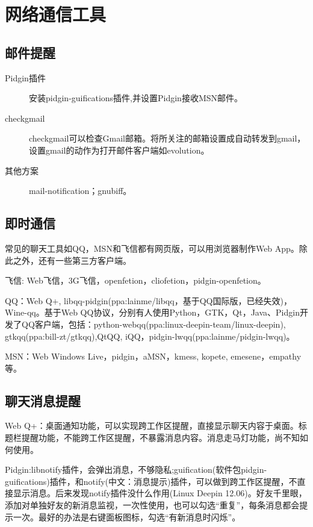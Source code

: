 \section{网络通信工具}

\subsection{邮件提醒}

\begin{description}
    \item[Pidgin插件]安装pidgin-guifications插件,并设置Pidgin接收MSN邮件。
    \item[checkgmail]checkgmail可以检查Gmail邮箱。将所关注的邮箱设置成自动转发到gmail，设置gmail的动作为打开邮件客户端如evolution。
    \item[其他方案]mail-notification；gnubiff。
\end{description}

\subsection{即时通信}

常见的聊天工具如QQ，MSN和飞信都有网页版，可以用浏览器制作Web App。除此之外，还有一些第三方客户端。

飞信: Web飞信，3G飞信，openfetion，cliofetion，pidgin-openfetion。

QQ：Web Q+, libqq-pidgin(ppa:lainme/libqq，基于QQ国际版，已经失效)，Wine-qq。基于Web QQ协议，分别有人使用Python，GTK，Qt，Java、Pidgin开发了QQ客户端，包括：python-webqq(ppa:linux-deepin-team/linux-deepin), gtkqq(ppa:bill-zt/gtkqq),QtQQ, iQQ，pidgin-lwqq(ppa:lainme/pidgin-lwqq)。

MSN：Web Windows Live，pidgin，aMSN，kmess, kopete, emesene，empathy等。

\subsection{聊天消息提醒}
Web Q+：桌面通知功能，可以实现跨工作区提醒，直接显示聊天内容于桌面。标题栏提醒功能，不能跨工作区提醒，不暴露消息内容。消息走马灯功能，尚不知如何使用。

Pidgin:libnotify插件，会弹出消息，不够隐私;guification(软件包pidgin-guifications)插件，和notify(中文：消息提示)插件，可以做到跨工作区提醒，不直接显示消息。后来发现notify插件没什么作用(Linux Deepin 12.06)。好友千里眼，添加对单独好友的新消息监视，一次性使用，也可以勾选“重复”，每条消息都会提示一次。最好的办法是右键面板图标，勾选“有新消息时闪烁”。

